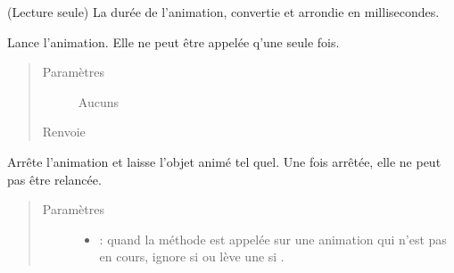 \documentclass[letterpaper,10pt,french]{sphinxmanual}
\begin{document}
\begin{fulllineitems}
\begin{fulllineitems}
\label{\detokenize{animation:pygame_animations.Animation.duration}}
\sphinxAtStartPar
(Lecture seule) La durée de l’animation, convertie et arrondie en millisecondes.

\end{fulllineitems}


\begin{fulllineitems}
\label{\detokenize{animation:pygame_animations.Animation.start}}
\sphinxAtStartPar
Lance l’animation. Elle ne peut être appelée q’une seule fois.
\begin{quote}\begin{description}
\item[{Paramètres}] \leavevmode
\sphinxAtStartPar
Aucuns

\item[{Renvoie}] \leavevmode
\sphinxAtStartPar
{}

\end{description}\end{quote}

\end{fulllineitems}

\label{\detokenize{animation:stopmethod}}

\begin{fulllineitems}
\label{\detokenize{animation:pygame_animations.Animation.stop}}
\sphinxAtStartPar
Arrête l’animation et laisse l’objet animé tel quel. Une fois arrêtée, elle ne peut pas être relancée.
\begin{quote}\begin{description}
\item[{Paramètres}] \leavevmode\begin{itemize}
\item {} 
\sphinxAtStartPar
{} : quand la méthode est appelée sur une animation qui n’est pas en cours, ignore si  ou lève une  si .


\end{itemize}
\end{description}
\end{quote}
\end{fulllineitems}
\end{fulllineitems}
\end{document}
